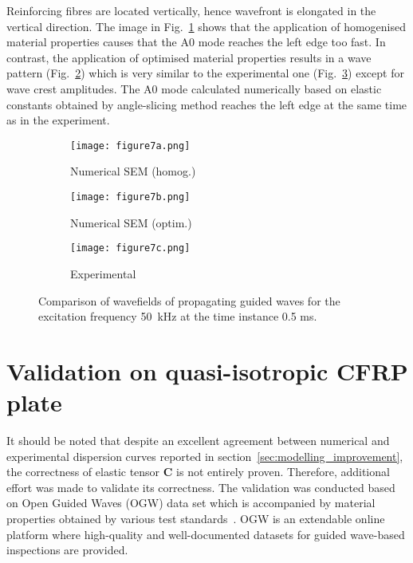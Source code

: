 \documentclass[preprint,12pt]{elsarticle}
\newcommand{\matr}[1]{\mathbf{#1}} %
\begin{document}
Reinforcing fibres are located vertically, hence wavefront is elongated in the vertical direction.
The image in Fig.~\ref{fig:wavefield_sem_homog} shows that the application of homogenised material properties causes that the A0 mode reaches the left edge too fast. 
In contrast, the application of optimised material properties results in a wave pattern (Fig.~\ref{fig:wavefield_sem_opt}) which is very similar to the experimental one (Fig.~\ref{fig:wavefield_exp}) except for wave crest amplitudes. 
The A0 mode calculated numerically based on elastic constants obtained by angle-slicing method reaches the left edge at the same time as in the experiment.
\begin{figure} [h!]
	\centering
	\begin{subfigure}[t]{0.32\textwidth}
		\centering
		\texttt{[image: figure7a.png]}
		\caption{Numerical SEM (homog.)}
		\label{fig:wavefield_sem_homog}
	\end{subfigure}
	\hfill
	\begin{subfigure}[t]{0.32\textwidth}
		\centering
		\texttt{[image: figure7b.png]}
		\caption{Numerical SEM (optim.)}
		\label{fig:wavefield_sem_opt}
	\end{subfigure}
	\hfill
	\begin{subfigure}[t]{0.32\textwidth}
		\centering
		\texttt{[image: figure7c.png]}
		\caption{Experimental}
		\label{fig:wavefield_exp}
	\end{subfigure}
	\caption{Comparison of wavefields of propagating guided waves for the excitation frequency 50~kHz at the time instance 0.5 ms.}
	\label{fig:wavefield_comparison}
\end{figure}
\clearpage
\section{Validation on quasi-isotropic CFRP plate\label{sec:validation}}
It should be noted that despite an excellent agreement between numerical and experimental dispersion curves reported in section~\ref{sec:modelling_improvement}, the correctness of elastic tensor $\matr{C}$ is not entirely proven.
Therefore, additional effort was made to validate its correctness.
The validation was conducted based on Open Guided Waves (OGW) data set which is accompanied by material properties obtained by various test standards~\cite{Moll2019}.
OGW is an extendable online platform where high-quality and well-documented datasets for guided wave-based inspections are provided.
\end{document}
